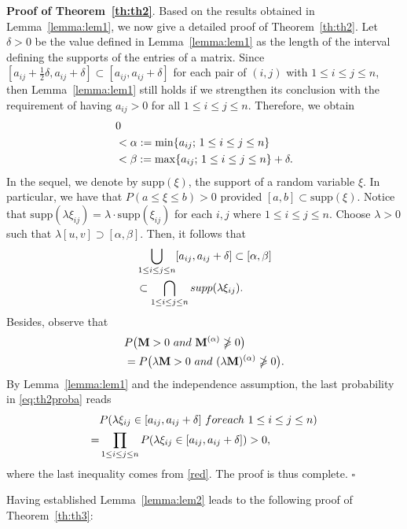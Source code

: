 \documentclass[conference,letterpaper]{IEEEtran}
\numberwithin{equation}{section}
\newcommand{\lbl}{\label}
\newcommand{\bea}{\begin{eqnarray}}
\newcommand{\eea}{\end{eqnarray}}
\begin{document}
\noindent\textbf{Proof of Theorem~\ref{th:th2}}. Based on the results obtained in Lemma~\ref{lemma:lem1}, we now give a detailed proof of Theorem~\ref{th:th2}. 
Let $\delta >0$ be the value defined in Lemma~\ref{lemma:lem1} as the length of the interval defining the supports of the entries of a matrix. 
Since $[a_{ij}+\frac{1}{2}\delta, a_{ij}+\delta] \subset [a_{ij}, a_{ij}+\delta]$  for each pair of $(i, j)$ with $1\leq i\leq j \leq n$, then Lemma~\ref{lemma:lem1} still holds if we strengthen its conclusion with the requirement of having $a_{ij}>0$ for all $1\leq i\leq j \leq n$.
Therefore, we obtain
\bea\lbl{poker}
&0\\\notag
&<\alpha:=\min\{a_{ij};\, 1\leq i\leq j \leq n\}\\\notag
& < \beta:=\max\{a_{ij};\, 1\leq i\leq j \leq n\}+\delta.\notag
\eea
In the sequel, we denote by $\mbox{supp}(\xi)$, the support of a random variable $\xi$.
In particular, we have that $P(a\leq \xi\leq  b)>0$ provided $[a, b]\subset \mbox{supp}(\xi)$.
Notice that $\mbox{supp}(\lambda\xi_{ij})=\lambda\cdot \mbox{supp}(\xi_{ij})$ for each $i, j$ where $1\leq i\leq j \leq n$. 
Choose $\lambda>0$ such that $\lambda [u, v]\supset [\alpha , \beta]$. 
Then, it follows that
\bea\lbl{red}
& \bigcup_{1\leq i\leq  j\leq n}[a_{ij}, a_{ij}+\delta] \subset [\alpha, \beta]\\\notag
& \subset \bigcap_{1\leq i\leq  j\leq n}  \mbox{supp}(\lambda\xi_{ij}).\notag
\eea
Besides, observe that
\bea\label{eq:th2proba}
& P\big(\mathbf{M}>0\ \mbox{and}\ \mathbf{M}^{(\alpha)}\ngeqslant 0\big)\\\notag
& = P\big(\lambda\mathbf{M}>0\ \mbox{and}\ (\lambda\mathbf{M})^{(\alpha)}\ngeqslant 0\big).\notag
\eea
By Lemma~\ref{lemma:lem1} and the independence assumption, the last probability in \eqref{eq:th2proba} reads
\begin{align}\notag
& P(\lambda \xi_{ij}\in [a_{ij}, a_{ij}+\delta]\ \mbox{for each}\ 1\leq i\leq j \leq n)\\\notag
=& \prod_{1\leq i\leq j \leq n}P(\lambda\xi_{ij}\in [a_{ij}, a_{ij}+\delta])>0,\notag
\end{align}
where the last inequality comes from \eqref{red}. 
The proof is thus complete. \hfill$\square$

\medskip



Having established Lemma~\ref{lemma:lem2} leads to the following proof of Theorem~\ref{th:th3}:
\end{document}
